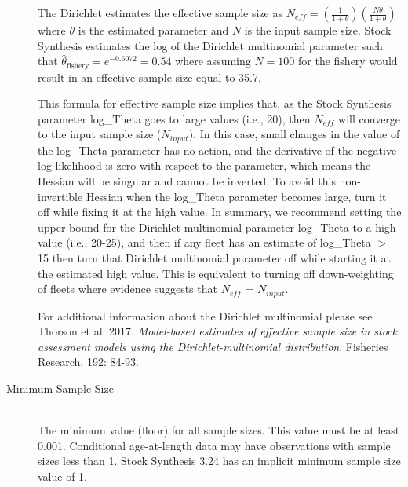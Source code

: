 \begin{description}
	\setlength{\parindent}{25pt}	
	The Dirichlet estimates the effective sample size as $N_{eff}=(\frac{1}{1+\theta})(\frac{N\theta}{1+\theta})$ where $\theta$ is the estimated parameter and $N$ is the input sample size.  Stock Synthesis estimates the log of the Dirichlet multinomial parameter such that $\hat{\theta}_{\text{fishery}} = e^{-0.6072} = 0.54$ where assuming $N=100$ for the fishery would result in an effective sample size equal to 35.7.
	

	This formula for effective sample size implies that, as the Stock Synthesis parameter log\_Theta goes to large values (i.e., 20), then  $N_{eff}$ will converge to the input sample size ($N_{input}$).  In this case, small changes in the value of the log\_Theta parameter has no action, and the derivative of the negative log-likelihood is zero with respect to the parameter, which means the Hessian will be singular and cannot be inverted. To avoid this non-invertible Hessian when the log\_Theta parameter becomes large, turn it off while fixing it at the high value. In summary, we recommend setting the upper bound for the Dirichlet multinomial parameter log\_Theta to a high value (i.e., 20-25), and then if any fleet has an estimate of log\_Theta $>$ 15 then turn that Dirichlet multinomial parameter off while starting it at the estimated high value.  This is equivalent to turning off down-weighting of fleets where evidence suggests that $N_{eff}$ = $N_{input}$.  
	
	For additional information about the Dirichlet multinomial please see Thorson et al. 2017. \textit{Model-based estimates of effective sample size in stock assessment models using the Dirichlet-multinomial distribution}. Fisheries Research, 192: 84-93.

	\item[Minimum Sample Size]\hfill\\
	The minimum value (floor) for all sample sizes. This value must be at least 0.001. Conditional age-at-length data may have observations with sample sizes less than 1. Stock Synthesis 3.24 has an implicit minimum sample size value of 1.
\end{description}

\hypertarget{CompTiming}{}
